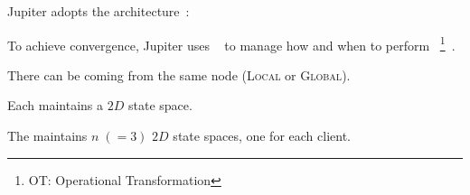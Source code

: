 
\begin{frame}{}
  \centerline{\Huge {}}
\end{frame}

\begin{frame}{}
  \centerline{\large Jupiter adopts the  architecture~:}

  \begin{center}
    \begin{minipage}{0.50\textwidth}
      
    \end{minipage}
  \end{center}

  \vspace{-1.00cm}
\end{frame}

\begin{frame}{}
  \begin{center}
    {\large To achieve convergence, Jupiter uses ~
    to manage how and when to perform ~\footnote{OT: Operational Transformation}~.}
  \end{center}


  \begin{center} 
    There can be  coming from the same node ({\textsc{\footnotesize Local}} or \textsc{\footnotesize Global}).
  \end{center}
\end{frame}

\begin{frame}{}
  \centerline{\large Each  maintains a $2D$ state space.}


  \centerline{\large The  maintains $n \; (=3)$ $2D$ state spaces, one for each client.}
\end{frame}

